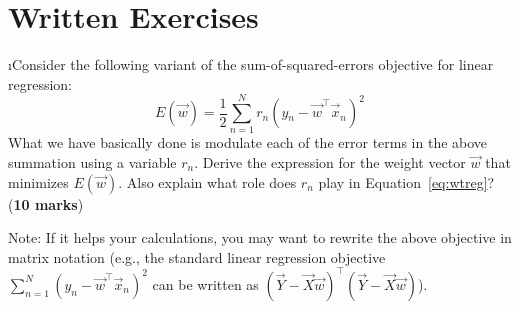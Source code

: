 \documentclass[fleqn]{article}
\begin{document}

\section{Written Exercises}

\bee

\i Consider the following variant of the sum-of-squared-errors objective for linear
regression:
\textsc{\begin{equation}
 E(\vec{w}) = \frac{1}{2}\sum_{n=1}^N r_n(y_n - \vec{w}^\top\vec{x}_n)^2
\label{eq:wtreg}
\end{equation}}
What we have basically done is modulate each of the error terms in 
the above summation using a variable $r_n$. Derive the expression 
for the weight vector $\vec{w}$ that minimizes $E(\vec{w})$. Also 
explain what role does $r_n$ play in Equation~\ref{eq:wtreg}?
(\textbf{10 marks})

Note: If it helps your calculations, you may want to rewrite the above 
objective in matrix notation (e.g., the standard 
linear regression objective $\sum_{n=1}^N (y_n - 
\vec{w}^\top\vec{x}_n)^2$ can be written as $(\vec{Y}-\vec{X}\vec{w})^\top 
(\vec{Y}-\vec{X}\vec{w})$).
\end{document}
